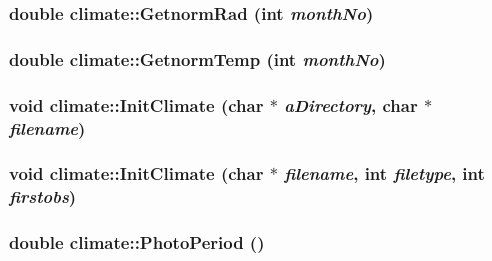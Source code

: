 \label{classclimate_ab8a4bb39891b9e00f8e9f06645e7b8de}
\hypertarget{classclimate_a2f109ffd62417e7151c7c816291bdbc8}{
\subsubsection[{GetnormRad}]{\setlength{\rightskip}{0pt plus 5cm}double climate::GetnormRad (int {\em monthNo})}}
\label{classclimate_a2f109ffd62417e7151c7c816291bdbc8}
\hypertarget{classclimate_acabf247267712ae1a2d35358e3cc03f7}{
\subsubsection[{GetnormTemp}]{\setlength{\rightskip}{0pt plus 5cm}double climate::GetnormTemp (int {\em monthNo})}}
\label{classclimate_acabf247267712ae1a2d35358e3cc03f7}
\hypertarget{classclimate_a29094eda7fd66a0aa17883633df94cce}{
\subsubsection[{InitClimate}]{\setlength{\rightskip}{0pt plus 5cm}void climate::InitClimate (char $\ast$ {\em aDirectory}, \/  char $\ast$ {\em filename})}}
\label{classclimate_a29094eda7fd66a0aa17883633df94cce}
\hypertarget{classclimate_af5d7b934fee70b30e504080310c4989e}{
\subsubsection[{InitClimate}]{\setlength{\rightskip}{0pt plus 5cm}void climate::InitClimate (char $\ast$ {\em filename}, \/  int {\em filetype}, \/  int {\em firstobs})}}
\label{classclimate_af5d7b934fee70b30e504080310c4989e}
\hypertarget{classclimate_a2a5a0fd4f393d95c69ecf170d06513fb}{
\subsubsection[{PhotoPeriod}]{\setlength{\rightskip}{0pt plus 5cm}double climate::PhotoPeriod ()}}
